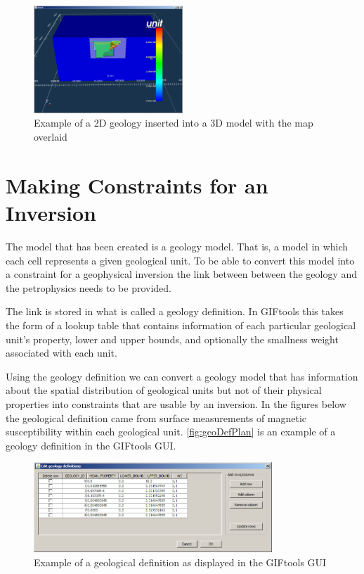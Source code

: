 \begin{figure} [h]
    \centering
    \includegraphics[width=0.5\textwidth]{images/MaptoModel/mapModelCross3D.PNG}
    \caption{Example of a 2D geology inserted into a 3D model with the map overlaid}
    \label{fig:mapModelCross3D}
\end{figure}
\FloatBarrier
\section{Making Constraints for an Inversion}
\label{sec:Making Constraints for and Inversion}

The model that has been created is a geology model. That is, a model in which each cell represents a given geological unit. To be able to convert this model into a constraint for a geophysical inversion the link between between the geology and the petrophysics needs to be provided. 

The link is stored in what is called a geology definition. In GIFtools this takes the form of a lookup table that contains information of each particular geological unit's property, lower and upper bounds, and optionally the smallness weight associated with each unit. 

Using the geology definition we can convert a geology model that has information about the spatial distribution of geological units but not of their physical properties into constraints that are usable by an inversion. In the figures below the geological definition came from surface measurements of magnetic susceptibility within each geological unit. \autoref{fig:geoDefPlan} is an example of a geology definition in the GIFtools GUI.
\begin{figure} [h]
    \centering
    \includegraphics[width=0.8\textwidth]{images/MaptoModel/geoDefPlan.PNG}
    \caption{Example of a geological definition as displayed in the GIFtools GUI}
    \label{fig:geoDefPlan}
\end{figure}

